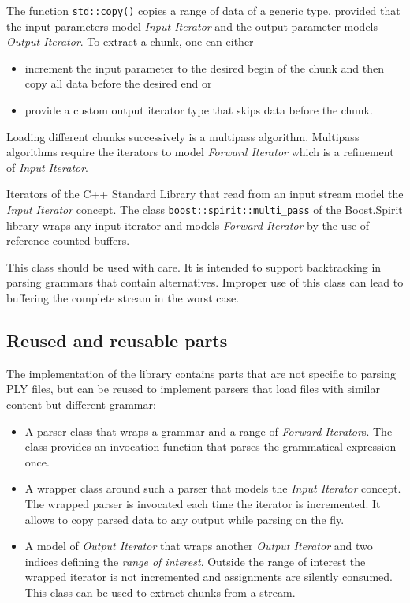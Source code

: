 \documentclass[a4paper,parskip=half,twocolumn]{scrartcl}
\begin{document}
The function \texttt{std::copy()} copies a range of data of a generic type,
provided that the input parameters model \emph{Input Iterator} and the output
parameter models \emph{Output Iterator}. To extract a chunk, one can either
\begin{itemize}
  \item increment the input parameter to the desired begin of the chunk and then
  copy all data before the desired end or
  \item provide a custom output iterator type that skips data before the chunk.
\end{itemize}

Loading different chunks successively is a multipass algorithm. Multipass
algorithms require the iterators to model \emph{Forward Iterator} which is a
refinement of \emph{Input Iterator}.

Iterators of the C++ Standard Library that read from an input stream model the
\emph{Input Iterator} concept. The class \texttt{boost::spirit::multi\_pass} of
the Boost.Spirit library wraps any input iterator and models \emph{Forward
Iterator} by the use of reference counted buffers.

This class should be used with care. It is intended to support backtracking in
parsing grammars that contain alternatives. Improper use of this class can lead
to buffering the complete stream in the worst case.

\subsection{Reused and reusable parts}

The implementation of the library contains parts that are not specific to
parsing PLY files, but can be reused to implement parsers that load files with
similar content but different grammar:

\begin{itemize}
  \item A parser class that wraps a grammar and a range of \emph{Forward
  Iterator}s. The class provides an invocation function that parses the
  grammatical expression once.
  \item A wrapper class around such a parser that models the \emph{Input
  Iterator} concept. The wrapped parser is invocated each time the iterator is
  incremented. It allows to copy parsed data to any output while parsing on the
  fly.
  \item A model of \emph{Output Iterator} that wraps another \emph{Output
  Iterator} and two indices defining the \emph{range of interest}. Outside the
  range of interest the wrapped iterator is not incremented and assignments are
  silently consumed. This class can be used to extract chunks from a stream.
\end{itemize}
\end{document}
